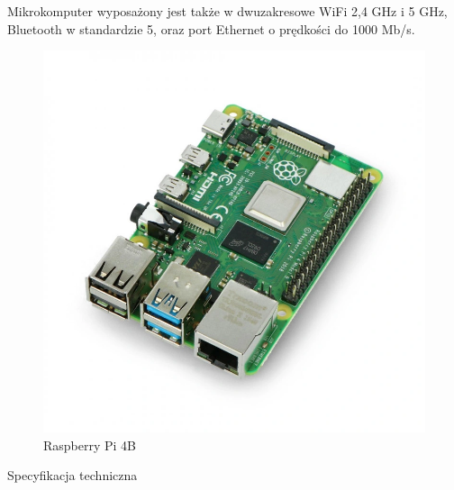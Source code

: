 \documentclass[a4paper,12pt,reqno]{article}
\begin{document}
Mikrokomputer wyposażony jest także w dwuzakresowe WiFi 2,4 GHz i 5 GHz, Bluetooth w standardzie 5, oraz port Ethernet o prędkości do 1000 Mb/s.

\begin{figure}[H]%
\centering
\includegraphics[width=0.8\columnwidth]{imgs/raspberrypi4.png}
\caption{Raspberry Pi 4B \cite{img_rp4b} \label{rp4b}}
\quad
\end{figure}

Specyfikacja techniczna
\end{document}
